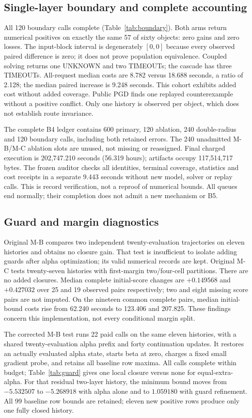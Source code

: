 \documentclass[11pt]{article}
\begin{document}
\subsection{Single-layer boundary and complete accounting}
All 120 boundary calls complete (Table~\ref{tab:boundary}). Both arms return
numerical positives on exactly the same 57 of sixty objects: zero gains and
zero losses. The input-block interval is degenerately $[0,0]$ because every
observed paired difference is zero; it does not prove population equivalence.
Coupled solving returns one UNKNOWN and two TIMEOUTs; the cascade has three
TIMEOUTs. All-request median costs are 8.782 versus 18.688 seconds, a ratio of
2.128; the median paired increase is 9.248 seconds. This cohort exhibits added
cost without added coverage. Public PGD finds one replayed counterexample
without a positive conflict. Only one history is observed per object, which
does not establish route invariance.

The complete B4 ledger contains 600 primary, 120 ablation, 240 double-radius
and 120 boundary calls, including both retained errors. The 240 unadmitted
M-B/M-C ablation slots are unused, not missing or reassigned. Final charged
execution is 202,747.210 seconds (56.319 hours); artifacts occupy 117,514,717
bytes. The frozen auditor checks all identities, terminal coverage, statistics
and cost receipts in a separate 9.443 seconds without new model, solver or
replay calls. This is record verification, not a reproof of numerical bounds.
All queues end normally; their completion does not admit a new mechanism or B5.

\subsection{Guard and margin diagnostics}
Original M-B compares two independent twenty-evaluation trajectories on eleven
histories and obtains no closure gain. That test is insufficient to isolate
adding guards after alpha optimization; its valid numerical records are kept.
Original M-C tests twenty-seven histories with first-margin two/four-cell
partitions. There are no added closures. Median complete initial-score changes
are $+0.149568$ and $+0.427032$ over 25 and 19 observed pairs respectively; two
and eight missing score pairs are not imputed. On the nineteen common complete
pairs, median initial-bound costs rise from 62.240 seconds to 123.406 and
207.825. These findings concern this implementation, not every conditional
margin split.

The corrected M-B test runs 22 paid calls on the same eleven histories, with a
shared twenty-evaluation alpha prefix and forty continuation updates. It
restores an actually evaluated alpha state, starts beta at zero, charges a
fixed small gradient probe, and retains all baseline row maxima. All calls
complete within budget; Table~\ref{tab:guard} gives one local closure versus
none for equal-extra-alpha. For that residual two-layer history, the minimum
bound moves from $-5.532507$ to $-5.268918$ with alpha alone and to $1.059180$
with guard refinement. All 99 baseline row bounds are retained; eleven new
positive rows produce only one fully closed history.
\end{document}
